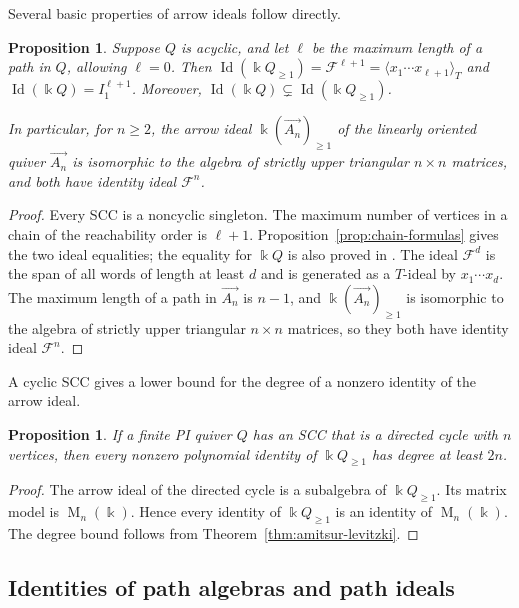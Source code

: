 \documentclass[11pt,reqno]{amsart}
\newcommand{\kk}{\Bbbk}
\newcommand{\F}{\mathcal F}
\newcommand{\Id}{\operatorname{Id}}
\newcommand{\Mat}{\operatorname{M}}
\newtheorem{proposition}[theorem]{Proposition}
\theoremstyle{definition}
\theoremstyle{remark}
\numberwithin{equation}{section}
\begin{document}
Several basic properties of arrow ideals follow directly.

\begin{proposition}\label{prop:acyclic-identities}
Suppose $Q$ is acyclic, and let $\ell$ be the maximum length of
a path in $Q$, allowing $\ell=0$. Then
$
 \Id(\kk Q_{\ge1})=\F^{\ell+1}
 =\langle x_1\cdots x_{\ell+1}\rangle_T$ and $
 \Id(\kk Q)=I_1^{\ell+1}$.
Moreover, $\Id(\kk Q)\subsetneq\Id(\kk Q_{\ge1})$.

In particular, for $n\ge2$, 
the arrow ideal $\kk(\overrightarrow{A_n})_{\ge1}$ of the linearly oriented quiver
$\overrightarrow{A_n}$ is isomorphic to the algebra of strictly
upper triangular $n\times n$ matrices, and both have identity ideal $\F^n$.
\end{proposition}

\begin{proof}
Every SCC is a noncyclic singleton. The maximum number of
vertices in a chain of the reachability order is $\ell+1$.
Proposition~\ref{prop:chain-formulas} gives the two ideal equalities;
the equality for $\kk Q$ is also proved in
\cite{CerulliIrelliEtAl2026}.
The ideal $\F^d$ is the span of all words of length at least $d$
and is generated as a $T$-ideal by $x_1\cdots x_d$.
The maximum length of a path in $\overrightarrow {A_n}$ is $n-1$, and $\kk(\overrightarrow {A_n})_{\ge1}$ is isomorphic to
the algebra of
strictly upper triangular $n\times n$ matrices, so they both have identity
ideal $\F^n$.
\end{proof}

A cyclic SCC gives a lower bound for the degree of a nonzero
identity of the arrow ideal.

\begin{proposition}\label{prop:cycle-degree}
If a finite PI quiver $Q$ has an SCC
that is a directed cycle with $n$ vertices,
then every nonzero polynomial identity of $\kk Q_{\ge1}$ has 
 degree at least $2n$.
\end{proposition}

\begin{proof}
The arrow ideal of the directed cycle is a subalgebra of
$\kk Q_{\ge1}$. Its matrix model is $\Mat_n(\kk)$. Hence every identity of $\kk Q_{\ge1}$ is an identity of
$\Mat_n(\kk)$.
The degree bound follows from Theorem~\ref{thm:amitsur-levitzki}.
\end{proof}

\subsection{Identities of path algebras and path ideals}
\label{sec:equality}
\end{document}

